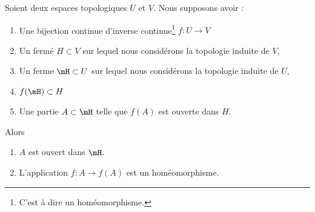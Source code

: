\begin{lemma}	\label{LEMooGANPooUJZmnM}
	Soient deux espaces topologiques \( U\) et \( V\). Nous supposons avoir :
	\begin{enumerate}
		\item
		      Une bijection continue d'inverse continue\footnote{C'est à dire un homéomorphisme.} \(f \colon U\to V  \)
		\item
		      Un fermé \( H\subset V\) sur lequel nous considérons la topologie induite de \( V\),
		\item
		      Un ferme \( \mH\subset U\) sur lequel nous considérons la topologie induite de \( U\),
		\item
		      \( f(\mH)\subset H\)
		\item
		      Une partie \( A\subset\mH\) telle que \( f(A)\) est ouverte dans \( H\).
	\end{enumerate}
	Alors
	\begin{enumerate}
		\item		\label{ITEMooIYGLooTrxugS}
		      \( A\) est ouvert dans \( \mH\).
		\item	\label{ITEMooDZHUooFJRRfi}
		      L'application \(f \colon A\to f(A)  \) est un homéomorphisme.
	\end{enumerate}

\end{lemma}

